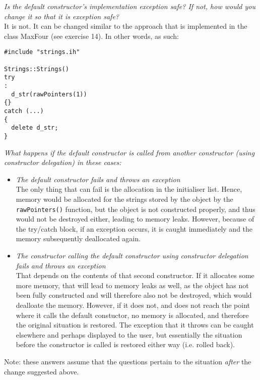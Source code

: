 \textit{Is the default constructor's implementation exception safe? If not, how would you change it so that it is exception safe?} \\
It is not. It can be changed similar to the approach that is implemented in the class MaxFour (see exercise 14). In other words, as such: \\
\begin{lstlisting}[style=in, caption=c\_strings.cc]
#include "strings.ih"

Strings::Strings()
try
:
  d_str(rawPointers(1))
{}
catch (...)
{
  delete d_str;
}
\end{lstlisting}

\textit{What happens if the default constructor is called from another constructor (using constructor delegation) in these cases:}

\begin{itemize}
  \item \textit{The default constructor fails and throws an exception} \\
    The only thing that can fail is the allocation in the initialiser list. Hence, memory would be allocated for the strings stored by the object by the \texttt{rawPointers()} function, but the object is not constructed properly, and thus would not be destroyed either, leading to memory leaks. However, because of the try/catch block, if an exception occurs, it is caught immediately and the memory subsequently deallocated again.
  \item \textit{The constructor calling the default constructor using constructor delegation fails and throws an exception} \\
    That depends on the contents of that second constructor. If it allocates some more memory, that will lead to memory leaks as well, as the object has not been fully constructed and will therefore also not be destroyed, which would dealloate the memory. However, if it does not, and does not reach the point where it calls the default constuctor, no memory is allocated, and therefore the original situation is restored. The exception that it throws can be caught elsewhere and perhaps displayed to the user, but essentially the situation before the constructor is called is restored either way (i.e. rolled back).
\end{itemize}

Note: these answers assume that the questions pertain to the situation \textit{after} the change suggested above.
